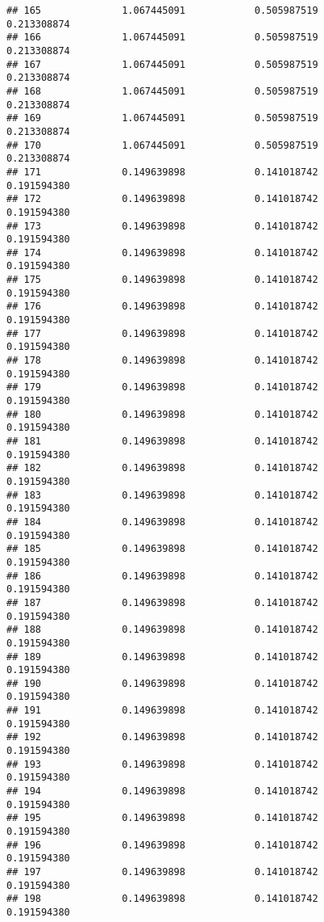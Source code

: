 \documentclass[]{article}
\begin{document}
\begin{verbatim}
## 165              1.067445091            0.505987519            0.213308874
## 166              1.067445091            0.505987519            0.213308874
## 167              1.067445091            0.505987519            0.213308874
## 168              1.067445091            0.505987519            0.213308874
## 169              1.067445091            0.505987519            0.213308874
## 170              1.067445091            0.505987519            0.213308874
## 171              0.149639898            0.141018742            0.191594380
## 172              0.149639898            0.141018742            0.191594380
## 173              0.149639898            0.141018742            0.191594380
## 174              0.149639898            0.141018742            0.191594380
## 175              0.149639898            0.141018742            0.191594380
## 176              0.149639898            0.141018742            0.191594380
## 177              0.149639898            0.141018742            0.191594380
## 178              0.149639898            0.141018742            0.191594380
## 179              0.149639898            0.141018742            0.191594380
## 180              0.149639898            0.141018742            0.191594380
## 181              0.149639898            0.141018742            0.191594380
## 182              0.149639898            0.141018742            0.191594380
## 183              0.149639898            0.141018742            0.191594380
## 184              0.149639898            0.141018742            0.191594380
## 185              0.149639898            0.141018742            0.191594380
## 186              0.149639898            0.141018742            0.191594380
## 187              0.149639898            0.141018742            0.191594380
## 188              0.149639898            0.141018742            0.191594380
## 189              0.149639898            0.141018742            0.191594380
## 190              0.149639898            0.141018742            0.191594380
## 191              0.149639898            0.141018742            0.191594380
## 192              0.149639898            0.141018742            0.191594380
## 193              0.149639898            0.141018742            0.191594380
## 194              0.149639898            0.141018742            0.191594380
## 195              0.149639898            0.141018742            0.191594380
## 196              0.149639898            0.141018742            0.191594380
## 197              0.149639898            0.141018742            0.191594380
## 198              0.149639898            0.141018742            0.191594380

\end{verbatim}
\end{document}
